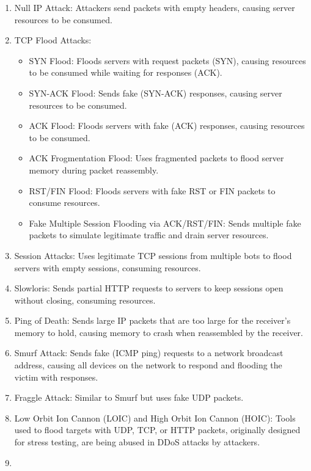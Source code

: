 \documentclass[a4paper, 12pt]{report} %
\begin{document}
        \begin{enumerate}
        \item Null IP Attack: Attackers send packets with empty headers, causing server resources to be consumed.
        \item TCP Flood Attacks:
        \begin{itemize}
            \item SYN Flood: Floods servers with request packets (SYN), causing resources to be consumed while waiting for responses (ACK).
            \item SYN-ACK Flood: Sends fake (SYN-ACK) responses, causing server resources to be consumed.
            \item ACK Flood: Floods servers with fake (ACK) responses, causing resources to be consumed.
            \item ACK Frogmentation Flood: Uses fragmented packets to flood server memory during packet reassembly.
            \item RST/FIN Flood: Floods servers with fake RST or FIN packets to consume resources.
            \item Fake Multiple Session Flooding via ACK/RST/FIN: Sends multiple fake packets to simulate legitimate traffic and drain server resources.
            
            
        \end{itemize}
        \item Session Attacks: Uses legitimate TCP sessions from multiple bots to flood servers with empty sessions, consuming resources.
        \item Slowloris: Sends partial HTTP requests to servers to keep sessions open without closing, consuming resources.
        \item Ping of Death: Sends large IP packets that are too large for the receiver’s memory to hold, causing memory to crash when reassembled by the receiver.
        \item Smurf Attack: Sends fake (ICMP ping) requests to a network broadcast address, causing all devices on the network to respond and flooding the victim with responses.
        \item Fraggle Attack: Similar to Smurf but uses fake UDP packets.
        \item Low Orbit Ion Cannon (LOIC) and High Orbit Ion Cannon (HOIC): Tools used to flood targets with UDP, TCP, or HTTP packets, originally designed for stress testing, are being abused in DDoS attacks by attackers.
        \item 
        \end{enumerate}
\end{document}
